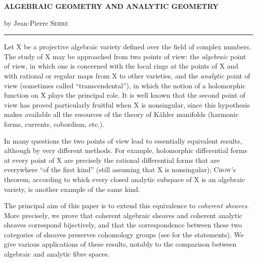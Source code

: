 \begin{center}
{\Large\bfseries ALGEBRAIC GEOMETRY AND ANALYTIC GEOMETRY}

\medskip
by Jean-Pierre \textsc{Serre}

\medskip
\rule{2.5cm}{0.4pt}
\end{center}

\tableofcontents


Let $\mathrm{X}$ be a projective algebraic variety defined over the field of complex numbers. The study of $\mathrm{X}$ may be approached from two points of view: the \textit{algebraic} point of view, in which one is concerned with the local rings at the points of $\mathrm{X}$ and with rational or regular maps from $\mathrm{X}$ to other varieties, and the \textit{analytic} point of view (sometimes called ``transcendental''), in which the notion of a holomorphic function on $\mathrm{X}$ plays the principal role. It is well known that the second point of view has proved particularly fruitful when $\mathrm{X}$ is nonsingular, since this hypothesis makes available all the resources of the theory of K\"ahler manifolds (harmonic forms, currents, cobordism, etc.).

In many questions the two points of view lead to essentially equivalent results, although by very different methods. For example, holomorphic differential forms at every point of $\mathrm{X}$ are precisely the rational differential forms that are everywhere ``of the first kind'' (still assuming that $\mathrm{X}$ is nonsingular); \textsc{Chow}'s theorem, according to which every closed analytic subspace of $\mathrm{X}$ is an algebraic variety, is another example of the same kind.

The principal aim of this paper is to extend this equivalence to \textit{coherent sheaves}. More precisely, we prove that coherent algebraic sheaves and coherent analytic sheaves correspond bijectively, and that the correspondence between these two categories of sheaves preserves cohomology groups (see  for the statements). We give various applications of these results, notably to the comparison between algebraic and analytic fibre spaces.

